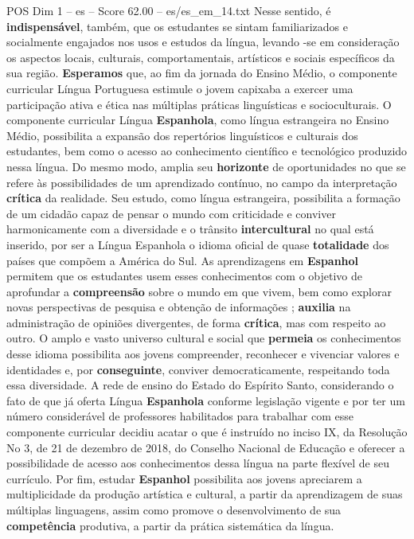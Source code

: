 \begin{textsample}{POS Dim 1 – es – Score 62.00 – es/es\_em\_14.txt}
Nesse sentido, é \textbf{indispensável}, também, que os estudantes se sintam familiarizados e socialmente engajados nos usos e estudos da língua, levando -se em consideração os aspectos locais, culturais, comportamentais, artísticos e sociais específicos da sua região. \textbf{Esperamos} que, ao fim da jornada do Ensino Médio, o componente curricular Língua Portuguesa estimule o jovem capixaba a exercer uma participação ativa e ética nas múltiplas práticas linguísticas e socioculturais.
O componente curricular Língua \textbf{Espanhola}, como língua estrangeira no Ensino Médio, possibilita a expansão dos repertórios linguísticos e culturais dos estudantes, bem como o acesso ao conhecimento científico e tecnológico produzido nessa língua.
Do mesmo modo, amplia seu \textbf{horizonte} de oportunidades no que se refere às possibilidades de um aprendizado contínuo, no campo da interpretação \textbf{crítica} da realidade.
Seu estudo, como língua estrangeira, possibilita a formação de um cidadão capaz de pensar o mundo com criticidade e conviver harmonicamente com a diversidade e o trânsito \textbf{intercultural} no qual está inserido, por ser a Língua Espanhola o idioma oficial de quase \textbf{totalidade} dos países que compõem a América do Sul.
As aprendizagens em \textbf{Espanhol} permitem que os estudantes usem esses conhecimentos com o objetivo de aprofundar a \textbf{compreensão} sobre o mundo em que vivem, bem como explorar novas perspectivas de pesquisa e obtenção de informações ; \textbf{auxilia} na administração de opiniões divergentes, de forma \textbf{crítica}, mas com respeito ao outro.
O amplo e vasto universo cultural e social que \textbf{permeia} os conhecimentos desse idioma possibilita aos jovens compreender, reconhecer e vivenciar valores e identidades e, por \textbf{conseguinte}, conviver democraticamente, respeitando toda essa diversidade.
A rede de ensino do Estado do Espírito Santo, considerando o fato de que já oferta Língua \textbf{Espanhola} conforme legislação vigente e por ter um número considerável de professores habilitados para trabalhar com esse componente curricular decidiu acatar o que é instruído no inciso IX, da Resolução No 3, de 21 de dezembro de 2018, do Conselho Nacional de Educação e oferecer a possibilidade de acesso aos conhecimentos dessa língua na parte flexível de seu currículo.
Por fim, estudar \textbf{Espanhol} possibilita aos jovens apreciarem a multiplicidade da produção artística e cultural, a partir da aprendizagem de suas múltiplas linguagens, assim como promove o desenvolvimento de sua \textbf{competência} produtiva, a partir da prática sistemática da língua.

\end{textsample}
